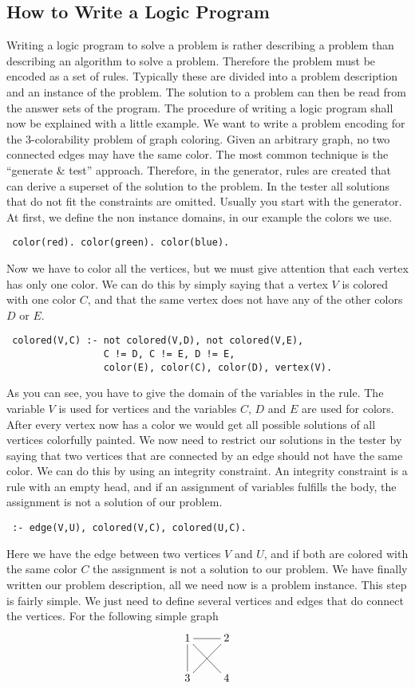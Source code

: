 \documentclass[a4paper,10pt]{article}
\begin{document}
\subsection{How to Write a Logic Program}
Writing a logic program to solve a problem is rather describing a problem than describing an algorithm to solve a problem.
Therefore the problem must be encoded as a set of rules.
Typically these are divided into a problem description and an instance of the problem.
The solution to a problem can then be read from the answer sets of the program.
The procedure of writing a logic program shall now be explained with a little example.
We want to write a problem encoding for the 3-colorability problem of graph coloring.
Given an arbitrary graph, no two connected edges may have the same color.
The most common technique is the ``generate \& test'' approach. Therefore, in the generator, rules are created that can derive a superset of the solution to the problem. In the tester all solutions that do not fit the constraints are omitted.
\newline
Usually you start with the generator.
At first, we define the non instance domains, in our example the colors we use.
\begin{verbatim}
 color(red). color(green). color(blue).
\end{verbatim}
Now we have to color all the vertices, but we must give attention that each vertex has only one color.
We can do this by simply saying that a vertex $V$ is colored with one color $C$, and that the same vertex does not have any of the other colors $D$ or $E$.
\begin{verbatim}
 colored(V,C) :- not colored(V,D), not colored(V,E),
                 C != D, C != E, D != E,
                 color(E), color(C), color(D), vertex(V).
\end{verbatim}
As you can see, you have to give the domain of the variables in the rule.
The variable $V$ is used for vertices and the variables $C$, $D$ and $E$ are used for colors.
After every vertex now has a color we would get all possible solutions of all vertices colorfully painted.
We now need to restrict our solutions in the tester by saying that two vertices that are connected by an edge should not have the same color.
We can do this by using an integrity constraint.
An integrity constraint is a rule with an empty head, and if an assignment of variables fulfills the body, the assignment is not a solution of our problem.
\begin{verbatim}
 :- edge(V,U), colored(V,C), colored(U,C).
\end{verbatim}
Here we have the edge between two vertices $V$ and $U$, and if both are colored with the same color $C$ the assignment is not a solution to our problem.
\newline
We have finally written our problem description, all we need now is a problem instance. This step is fairly simple.
We just need to define several vertices and edges that do connect the vertices.
For the following simple graph
\[
 \xymatrix{1\ar@{-}[dr]\ar@{-}[d]\ar@{-}[r]&2\ar@{-}[dl]\\
           3&4}
\]
\end{document}

